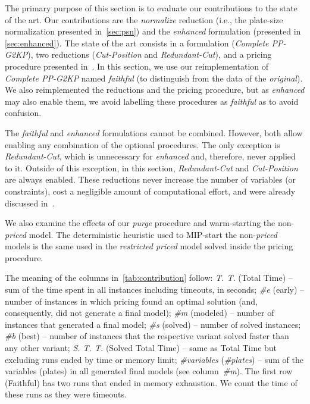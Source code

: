 \documentclass[smallextended]{svjour3}       %
\begin{document}
The primary purpose of this section is to evaluate our contributions to the state of the art.
Our contributions are the \emph{normalize} reduction (i.e., the plate-size normalization presented in~\autoref{sec:psn}) and the \emph{enhanced} formulation (presented in \autoref{sec:enhanced}).
The state of the art consists in a formulation (\emph{Complete PP-G2KP}), two reductions (\emph{Cut-Position} and \emph{Redundant-Cut}), and a pricing procedure presented in~\cite{furini:2016,dimitri_thesis}.
In this section, we use our reimplementation of \emph{Complete PP-G2KP} named \emph{faithful} (to distinguish from the data of the \emph{original}).
We also reimplemented the reductions and the pricing procedure, but as \emph{enhanced} may also enable them, we avoid labelling these procedures as \emph{faithful} as to avoid confusion.

The \emph{faithful} and \emph{enhanced} formulations cannot be combined.
However, both allow enabling any combination of the optional procedures.
The only exception is \emph{Redundant-Cut}, which is unnecessary for \emph{enhanced} and, therefore, never applied to it.
Outside of this exception, in this section, \emph{Redundant-Cut} and \emph{Cut-Position} are always enabled.
These reductions never increase the number of variables (or constraints), cost a negligible amount of computational effort, and were already discussed in~\cite{furini:2016,dimitri_thesis}.

We also examine the effects of our \emph{purge} procedure and warm-starting the non-\emph{priced} model.
The deterministic heuristic used to MIP-start the non-\emph{priced} models is the same used in the \emph{restricted priced} model solved inside the pricing procedure.

The meaning of the columns in~\autoref{tab:contribution} follow:
\emph{T. T.} (Total Time) -- sum of the time spent in all instances including timeouts, in seconds;
\emph{\#e} (early) -- number of instances in which pricing found an optimal solution (and, consequently, did not generate a final model);
\emph{\#m} (modeled) -- number of instances that generated a final model;
\emph{\#s} (solved) -- number of solved instances;
\emph{\#b} (best) -- number of instances that the respective variant solved faster than any other variant;
\emph{S. T. T.} (Solved Total Time) -- same as Total Time but excluding runs ended by time or memory limit;
\emph{\#variables} (\emph{\#plates}) -- sum of the variables (plates) in all generated final models (see column~\emph{\#m}).
The first row (Faithful) has two runs that ended in memory exhaustion.
We count the time of these runs as they were timeouts.
\end{document}
